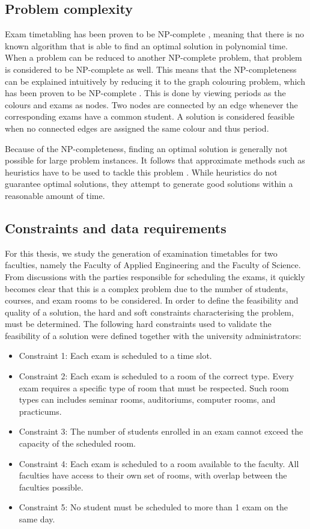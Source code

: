 \subsection{Problem complexity}

Exam timetabling has been proven to be NP-complete \cite{even1976}, meaning that there is no known algorithm that is able to find an optimal solution in polynomial time. When a problem can be reduced to another NP-complete problem, that problem is considered to be NP-complete as well. This means that the NP-completeness can be explained intuitively by reducing it to the graph colouring problem, which has been proven to be NP-complete \cite{karp1972}. This is done by viewing periods as the colours and exams as nodes. Two nodes are connected by an edge whenever the corresponding exams have a common student. A solution is considered feasible when no connected edges are assigned the same colour and thus period. 

Because of the NP-completeness, finding an optimal solution is generally not possible for large problem instances. It follows that approximate methods such as heuristics have to be used to tackle this problem \cite{farreny1986}. While heuristics do not guarantee optimal solutions, they attempt to generate good solutions within a reasonable amount of time.



\subsection{Constraints and data requirements}

For this thesis, we study the generation of examination timetables for two faculties, namely the Faculty of Applied Engineering and the Faculty of Science. From discussions with the parties responsible for scheduling the exams, it quickly becomes clear that this is a complex problem due to the number of students, courses, and exam rooms to be considered. In order to define the feasibility and quality of a solution, the hard and soft constraints characterising the problem, must be determined. The following hard constraints used to validate the feasibility of a solution were defined together with the university administrators:

\begin{itemize}
    \item Constraint 1: Each exam is scheduled to a time slot.
    \item Constraint 2: Each exam is scheduled to a room of the correct type. Every exam requires a specific type of room that must be respected. Such room types can includes seminar rooms, auditoriums, computer rooms, and practicums.
    \item Constraint 3: The number of students enrolled in an exam cannot exceed the capacity of the scheduled room.
    \item Constraint 4: Each exam is scheduled to a room available to the faculty. All faculties have access to their own set of rooms, with overlap between the faculties possible.
    \item Constraint 5: No student must be scheduled to more than 1 exam on the same day.
\end{itemize}

